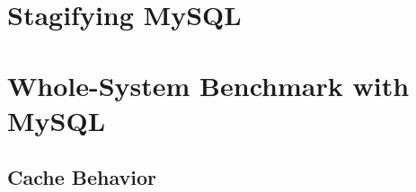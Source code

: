 \documentclass[12pt,a4paper]{book}
\begin{document}



\section{Stagifying MySQL}\label{ch:eval:stageapi}

\section{Whole-System Benchmark with MySQL}\label{ch:eval:perf}


\subsection{Cache Behavior}\label{ch:eval:perfcache}
\end{document}
